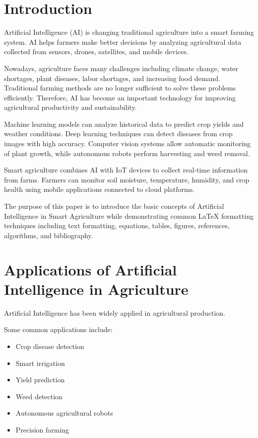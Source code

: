 \documentclass[pdflatex,sn-mathphys-num]{sn-jnl}%
\theoremstyle{thmstyleone}%
\theoremstyle{thmstyletwo}%
\theoremstyle{thmstylethree}%
\begin{document}
\section{Introduction}
\label{sec:introduction}

Artificial Intelligence (AI) is changing traditional agriculture into a smart farming system. AI helps farmers make better decisions by analyzing agricultural data collected from sensors, drones, satellites, and mobile devices.

Nowadays, agriculture faces many challenges including climate change, water shortages, plant diseases, labor shortages, and increasing food demand. Traditional farming methods are no longer sufficient to solve these problems efficiently. Therefore, AI has become an important technology for improving agricultural productivity and sustainability.

Machine learning models can analyze historical data to predict crop yields and weather conditions. Deep learning techniques can detect diseases from crop images with high accuracy. Computer vision systems allow automatic monitoring of plant growth, while autonomous robots perform harvesting and weed removal.

Smart agriculture combines AI with IoT devices to collect real-time information from farms. Farmers can monitor soil moisture, temperature, humidity, and crop health using mobile applications connected to cloud platforms.

The purpose of this paper is to introduce the basic concepts of Artificial Intelligence in Smart Agriculture while demonstrating common LaTeX formatting techniques including text formatting, equations, tables, figures, references, algorithms, and bibliography.


\section{Applications of Artificial Intelligence in Agriculture}

\label{sec:application}

Artificial Intelligence has been widely applied in agricultural production.

Some common applications include:

\begin{itemize}

\item Crop disease detection

\item Smart irrigation

\item Yield prediction

\item Weed detection

\item Autonomous agricultural robots

\item Precision farming

\end{itemize}
\end{document}
